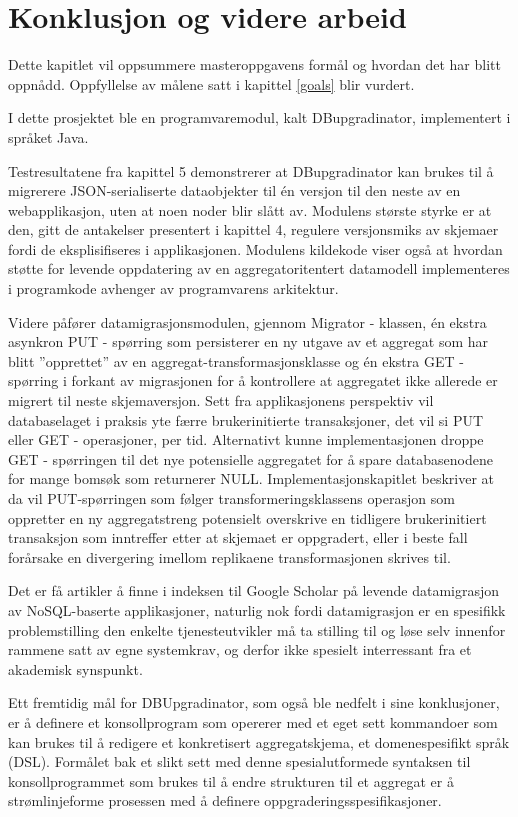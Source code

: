
\chapter{Konklusjon og videre arbeid}

Dette kapitlet vil oppsummere masteroppgavens formål og hvordan det har blitt oppnådd. Oppfyllelse av målene satt i kapittel \ref{goals} blir vurdert.

I dette prosjektet ble en programvaremodul, kalt DBupgradinator, implementert i språket Java.

Testresultatene fra kapittel 5 demonstrerer at DBupgradinator kan brukes til å migrerere JSON-serialiserte dataobjekter til én versjon til den neste av en webapplikasjon, uten at noen noder blir slått av. Modulens største styrke er at den, gitt de antakelser presentert i kapittel 4, regulere versjonsmiks av skjemaer fordi de eksplisifiseres i applikasjonen. Modulens kildekode viser også at hvordan støtte for levende oppdatering av en aggregatoritentert datamodell implementeres i programkode avhenger av programvarens arkitektur.

Videre påfører datamigrasjonsmodulen, gjennom Migrator - klassen, én ekstra asynkron PUT - spørring som persisterer en ny utgave av et aggregat som har blitt ''opprettet'' av en aggregat-transformasjonsklasse og én ekstra GET - spørring i forkant av migrasjonen for å kontrollere at aggregatet ikke allerede er migrert til neste skjemaversjon. Sett fra applikasjonens perspektiv vil databaselaget i praksis yte færre brukerinitierte transaksjoner, det vil si PUT eller GET - operasjoner, per tid. Alternativt kunne implementasjonen droppe GET - spørringen til det nye potensielle aggregatet for å spare databasenodene for mange bomsøk som returnerer NULL. Implementasjonskapitlet beskriver at da vil PUT-spørringen som følger transformeringsklassens operasjon som oppretter en ny aggregatstreng potensielt overskrive en tidligere brukerinitiert transaksjon som inntreffer etter at skjemaet er oppgradert, eller i beste fall forårsake en divergering imellom replikaene transformasjonen skrives til.

Det er få artikler å finne i indeksen til Google Scholar på levende datamigrasjon av NoSQL-baserte applikasjoner, naturlig nok fordi datamigrasjon er en spesifikk problemstilling den enkelte tjenesteutvikler må ta stilling til og løse selv innenfor rammene satt av egne systemkrav, og derfor ikke spesielt interressant fra et akademisk synspunkt. 

Ett fremtidig mål for DBUpgradinator, som også ble nedfelt i \cite{saur2016} sine konklusjoner, er å definere et konsollprogram som opererer med et eget sett kommandoer som kan brukes til å redigere et konkretisert aggregatskjema, et domenespesifikt språk (DSL).  Formålet bak et slikt sett med denne spesialutformede syntaksen til konsollprogrammet som brukes til å endre strukturen til et aggregat er å strømlinjeforme prosessen med å definere oppgraderingsspesifikasjoner.

\cleardoublepage

